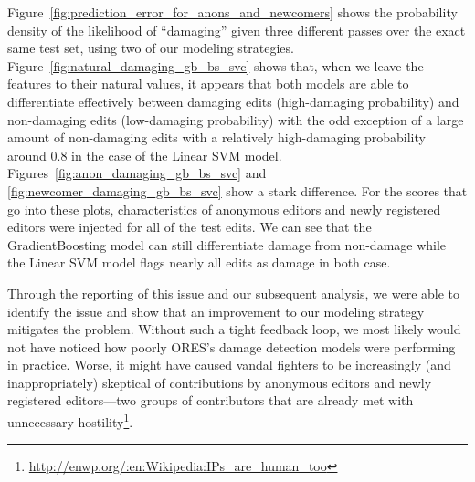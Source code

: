 Figure~\ref{fig:prediction_error_for_anons_and_newcomers} shows the probability density of the likelihood of ``damaging'' given three different passes over the exact same test set, using two of our modeling strategies.  Figure~\ref{fig:natural_damaging_gb_bs_svc} shows that, when we leave the features to their natural values, it appears that both models are able to differentiate effectively between damaging edits (high-damaging probability) and non-damaging edits (low-damaging probability) with the odd exception of a large amount of non-damaging edits with a relatively high-damaging probability around 0.8 in the case of the Linear SVM model.  Figures~\ref{fig:anon_damaging_gb_bs_svc} and \ref{fig:newcomer_damaging_gb_bs_svc} show a stark difference.  For the scores that go into these plots, characteristics of anonymous editors and newly registered editors were injected for all of the test edits.  We can see that the GradientBoosting model can still differentiate damage from non-damage while the Linear SVM model flags nearly all edits as damage in both case.

Through the reporting of this issue and our subsequent analysis, we were able to identify the issue and show that an improvement to our modeling strategy mitigates the problem.  Without such a tight feedback loop, we most likely would not have noticed how poorly ORES's damage detection models were performing in practice.  Worse, it might have caused vandal fighters to be increasingly (and inappropriately) skeptical of contributions by anonymous editors and newly registered editors---two groups of contributors that are already met with unnecessary hostility\footnote{\url{http://enwp.org/:en:Wikipedia:IPs_are_human_too}}\cite{halfaker2013rise}.

